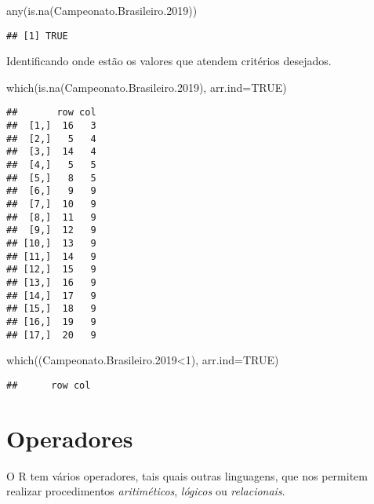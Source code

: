 \documentclass[
]{book}
\newenvironment{Shaded}{\begin{snugshade}}{\end{snugshade}}
\newcommand{\AttributeTok}[1]{\textcolor[rgb]{0.77,0.63,0.00}{#1}}
\newcommand{\ConstantTok}[1]{\textcolor[rgb]{0.00,0.00,0.00}{#1}}
\newcommand{\DecValTok}[1]{\textcolor[rgb]{0.00,0.00,0.81}{#1}}
\newcommand{\FloatTok}[1]{\textcolor[rgb]{0.00,0.00,0.81}{#1}}
\newcommand{\FunctionTok}[1]{\textcolor[rgb]{0.00,0.00,0.00}{#1}}
\newcommand{\NormalTok}[1]{#1}
\newcommand{\SpecialCharTok}[1]{\textcolor[rgb]{0.00,0.00,0.00}{#1}}
\begin{document}
\begin{Shaded}
\begin{Highlighting}[]
\FunctionTok{any}\NormalTok{(}\FunctionTok{is.na}\NormalTok{(Campeonato.Brasileiro}\FloatTok{.2019}\NormalTok{))}
\end{Highlighting}
\end{Shaded}

\begin{verbatim}
## [1] TRUE
\end{verbatim}

Identificando onde estão os valores que atendem critérios desejados.

\begin{Shaded}
\begin{Highlighting}[]
\FunctionTok{which}\NormalTok{(}\FunctionTok{is.na}\NormalTok{(Campeonato.Brasileiro}\FloatTok{.2019}\NormalTok{), }\AttributeTok{arr.ind=}\ConstantTok{TRUE}\NormalTok{)}
\end{Highlighting}
\end{Shaded}

\begin{verbatim}
##       row col
##  [1,]  16   3
##  [2,]   5   4
##  [3,]  14   4
##  [4,]   5   5
##  [5,]   8   5
##  [6,]   9   9
##  [7,]  10   9
##  [8,]  11   9
##  [9,]  12   9
## [10,]  13   9
## [11,]  14   9
## [12,]  15   9
## [13,]  16   9
## [14,]  17   9
## [15,]  18   9
## [16,]  19   9
## [17,]  20   9
\end{verbatim}

\begin{Shaded}
\begin{Highlighting}[]
\FunctionTok{which}\NormalTok{((Campeonato.Brasileiro}\FloatTok{.2019}\SpecialCharTok{\textless{}}\DecValTok{1}\NormalTok{), }\AttributeTok{arr.ind=}\ConstantTok{TRUE}\NormalTok{)}
\end{Highlighting}
\end{Shaded}

\begin{verbatim}
##      row col
\end{verbatim}

\hypertarget{operadores}{%
\section{Operadores}\label{operadores}}

O R tem vários operadores, tais quais outras linguagens, que nos permitem realizar procedimentos \emph{aritiméticos}, \emph{lógicos} ou \emph{relacionais}.
\end{document}
